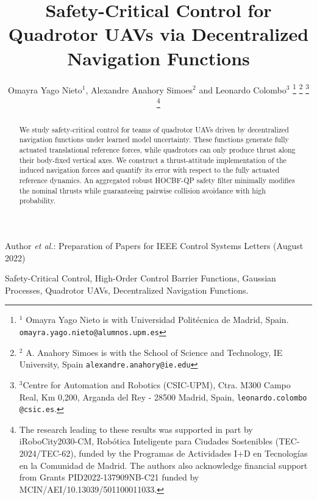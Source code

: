 \documentclass[journal,twoside,web]{ieeecolor}
\begin{document}
\def\BibTeX{{\rm B\kern-.05em{\sc i\kern-.025em b}\kern-.08em
    T\kern-.1667em\lower.7ex\hbox{E}\kern-.125emX}}
{Author \MakeLowercase{\textit{et al.}}: Preparation of Papers for IEEE Control Systems Letters (August 2022)}


\title{Safety-Critical Control for Quadrotor UAVs via Decentralized Navigation Functions}


\author{Omayra Yago Nieto$^{1}$, Alexandre Anahory Simoes$^{2}$ and Leonardo Colombo$^{3}$
\thanks{$^1$ Omayra Yago Nieto is with Universidad Politécnica de Madrid, Spain. {\tt\small omayra.yago.nieto@alumnos.upm.es}}
\thanks{$^2$ A. Anahory Simoes is with the School of Science and Technology, IE University, Spain
        {\tt\small alexandre.anahory@ie.edu}}
\thanks{$^3$Centre for Automation and Robotics (CSIC-UPM), Ctra. M300 Campo Real, Km 0,200, Arganda del Rey - 28500 Madrid, Spain, {\tt\small leonardo.colombo @csic.es}.}
\thanks{The research leading to these results was supported in part by iRoboCity2030-CM, Robótica Inteligente para Ciudades Sostenibles (TEC-2024/TEC-62), funded by the Programas de Actividades I+D en Tecnologías en la Comunidad de Madrid. The authors also acknowledge financial support from Grants PID2022-137909NB-C21 funded by MCIN/AEI/10.13039/501100011033.}}



\maketitle
\thispagestyle{empty}
 

\begin{abstract}
We study safety-critical control for teams of quadrotor UAVs driven
by decentralized navigation functions under learned model
uncertainty. These functions generate fully actuated translational
reference forces, while quadrotors can only produce thrust along
their body-fixed vertical axes. We construct a thrust-attitude
implementation of the induced navigation forces and quantify its
error with respect to the fully actuated reference dynamics. An
aggregated robust HOCBF-QP safety filter minimally modifies the
nominal thrusts while guaranteeing pairwise collision avoidance
with high probability.
\end{abstract}

\begin{IEEEkeywords}
Safety-Critical Control, High-Order Control Barrier Functions,
Gaussian Processes, Quadrotor UAVs, Decentralized Navigation Functions.
\end{IEEEkeywords}
\end{document}
